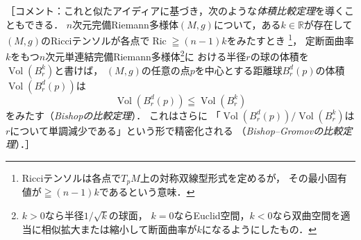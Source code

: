 \documentclass[uplatex,dvipdfmx,fontsize=12pt,jafontsize=11pt,line_length=42zw,number_of_lines=36,hanging_punctuation]{jlreq}
\DeclareMathOperator{\Ric}{Ric}
\DeclareMathOperator{\Vol}{Vol}
\begin{document}
\begin{enumerate-problems}
		［コメント：これと似たアイディアに基づき，次のような\emph{体積比較定理}を導くこともできる．
		$n$次元完備Riemann多様体$(M,g)$について，ある$k\in\mathbb{R}$が存在して
		$(M,g)$のRicciテンソルが各点で$\Ric\geqq (n-1)k$をみたすとき
		\footnote{Ricciテンソルは各点で$T_pM$上の対称双線型形式を定めるが，
		その最小固有値が$\geqq (n-1)k$であるという意味．}，
		定断面曲率$k$をもつ$n$次元単連結完備Riemann多様体\footnote{$k>0$なら半径$1/\sqrt{k}$の球面，
		$k=0$ならEuclid空間，$k<0$なら双曲空間を適当に相似拡大または縮小して断面曲率が$k$になるようにしたもの．}に
		おける半径$r$の球の体積を$\Vol(B^k_r)$と書けば，
		$(M,g)$の任意の点$p$を中心とする距離球$B^d_r(p)$の体積$\Vol(B^d_r(p))$は
		\begin{equation}
			\Vol(B^d_r(p))\leqq\Vol(B^k_r)
		\end{equation}
		をみたす（\emph{Bishopの比較定理}）．
		これはさらに
		「$\Vol(B^d_r(p))/\Vol(B^k_r)$は$r$について単調減少である」という形で精密化される
		（\emph{Bishop--Gromovの比較定理}）．］
\end{enumerate-problems}
\end{document}
